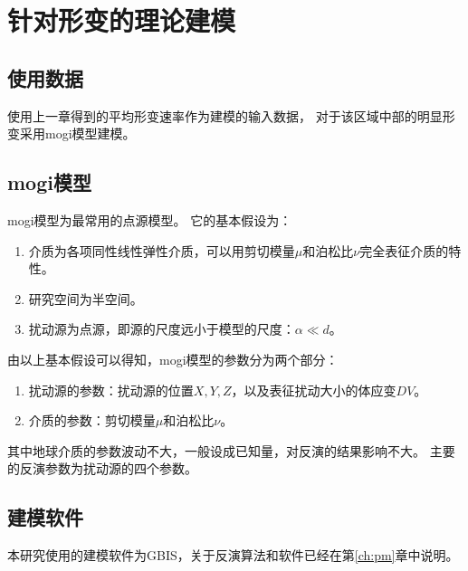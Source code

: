 \chapter{针对形变的理论建模}

\section{使用数据}
使用上一章得到的平均形变速率作为建模的输入数据，
对于该区域中部的明显形变采用mogi模型建模。

\section{mogi模型}
mogi模型为最常用的点源模型。
它的基本假设为：
\begin{enumerate}
    \item 介质为各项同性线性弹性介质，可以用剪切模量$\mu$和泊松比$\nu$完全表征介质的特性。
    \item 研究空间为半空间。
    \item 扰动源为点源，即源的尺度远小于模型的尺度：$\alpha \ll d$。
\end{enumerate}

由以上基本假设可以得知，mogi模型的参数分为两个部分：
\begin{enumerate}
    \item 扰动源的参数：扰动源的位置$X,Y,Z$，以及表征扰动大小的体应变$DV$。
    \item 介质的参数：剪切模量$\mu$和泊松比$\nu$。
\end{enumerate}
其中地球介质的参数波动不大，一般设成已知量，对反演的结果影响不大。
主要的反演参数为扰动源的四个参数。

\section{建模软件}
本研究使用的建模软件为GBIS，关于反演算法和软件已经在第\ref{ch:pm}章中说明。

